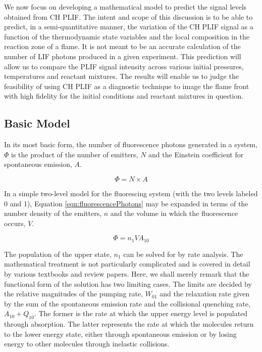 We now focus on developing a mathematical model to predict the signal levels obtained from CH PLIF.
The intent and scope of this discussion is to be able to predict, in a semi-quantitative manner, the variation of the CH PLIF signal as a function of the thermodynamic state variables and the local composition in the reaction zone of a flame.
It is not meant to be an accurate calculation of the number of LIF photons produced in a given experiment.
This prediction will allow us to compare the PLIF signal intensity across various initial pressures, temperatures and reactant mixtures.
The results will enable us to judge the feasibility of using CH PLIF as a diagnostic technique to image the flame front with high fidelity for the initial conditions and reactant mixtures in question.

\subsection{Basic Model}

In its most basic form, the number of fluorescence photons generated in a system, \(\Phi\) is the product of the number of emitters, \(N\) and the Einstein coefficient for spontaneous emission, \(A\).

\begin{equation}
  \Phi = N\times A
  \label{eqn:fluorescencePhotons}
\end{equation}

In a simple two-level model for the fluorescing system (with the two levels labeled 0 and 1), Equation \ref{eqn:fluorescencePhotons} may be expanded in terms of the number density of the emitters, \(n\) and the volume in which the fluorescence occurs, \(V\).

\begin{equation}
  \Phi = n_1VA_{10}
\end{equation}

The population of the upper state, \(n_1\) can be solved for by rate analysis.
The mathematical treatment is not particularly complicated and is covered in detail by various textbooks and review papers.\cite{1997-daily}
Here, we shall merely remark that the functional form of the solution has two limiting cases.
The limits are decided by the relative magnitudes of the pumping rate, \(W_{01}\) and the relaxation rate given by the sum of the spontaneous emission rate and the collisional quenching rate, \(A_{10} + Q_{10}\).
The former is the rate at which the upper energy level is populated through absorption.
The latter represents the rate at which the molecules return to the lower energy state, either through spontaneous emission or by losing energy to other molecules through inelastic collisions.

